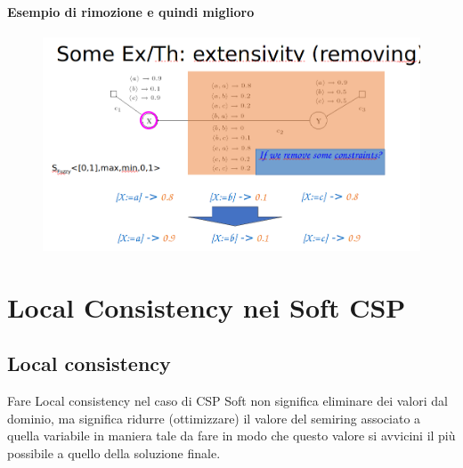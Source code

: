 \subsubsection{Esempio di rimozione e quindi miglioro}
\begin{figure}[htp]
	\centering
    \includegraphics[width=12.5cm, keepaspectratio]{img/Cap4/better2.png}
\end{figure}


\chapter{Local Consistency nei Soft CSP} \label{ch:Local Consistency nei Soft CSP}
\section{Local consistency}
Fare Local consistency nel caso di CSP Soft non significa eliminare dei valori dal dominio, ma significa ridurre (ottimizzare) il valore del semiring associato a quella variabile in maniera tale da fare in modo che questo valore si avvicini il più possibile a quello della soluzione finale.
